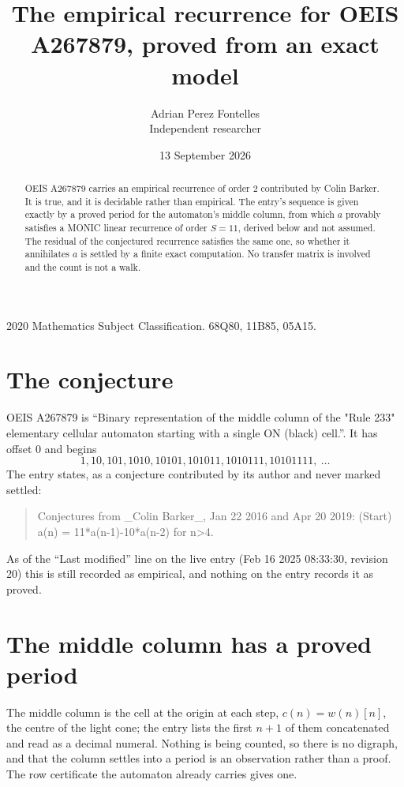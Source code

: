 \documentclass[11pt,a4paper]{article}
\title{The empirical recurrence for OEIS A267879, proved from an exact model}
\author{Adrian Perez Fontelles\\ \small Independent researcher}
\date{13 September 2026}
\theoremstyle{plain}
\theoremstyle{definition}
\begin{document}
\maketitle

\begin{abstract}
OEIS A267879 carries an empirical recurrence of order $2$ contributed by Colin Barker. It is true, and it is
decidable rather than empirical. The entry's sequence is given exactly by a proved period for the automaton's middle column, from
which $a$ provably satisfies a MONIC linear recurrence of order $S=11$, derived below and not
assumed. The residual of the conjectured recurrence satisfies the same one, so whether it
annihilates $a$ is settled by a finite exact computation. No transfer matrix is involved and
the count is not a walk.
\end{abstract}

\noindent\small 2020 Mathematics Subject Classification. 68Q80, 11B85, 05A15.\normalsize

\section{The conjecture}

OEIS A267879 is ``Binary representation of the middle column of the "Rule 233" elementary cellular automaton starting with a single ON (black) cell.''. It has offset $0$ and begins
\[
1, 10, 101, 1010, 10101, 101011, 1010111, 10101111,\ \dots
\]
The entry states, as a conjecture contributed by its author and never marked settled:
\begin{quote}
Conjectures from \_Colin Barker\_, Jan 22 2016 and Apr 20 2019: (Start) a(n) = 11*a(n-1)-10*a(n-2) for n>4.
\end{quote}
As of the ``Last modified'' line on the live entry (Feb 16 2025 08:33:30, revision 20)
this is still recorded as empirical, and nothing on the entry records it as proved.

\section{The middle column has a proved period}

The middle column is the cell at the origin at each step, $c(n)=w(n)[n]$, the centre of the
light cone; the entry lists the first $n+1$ of them concatenated and read as a decimal numeral. Nothing is being counted, so there is no digraph, and that
the column settles into a period is an observation rather than a proof. The row certificate the
automaton already carries gives one.
\end{document}
